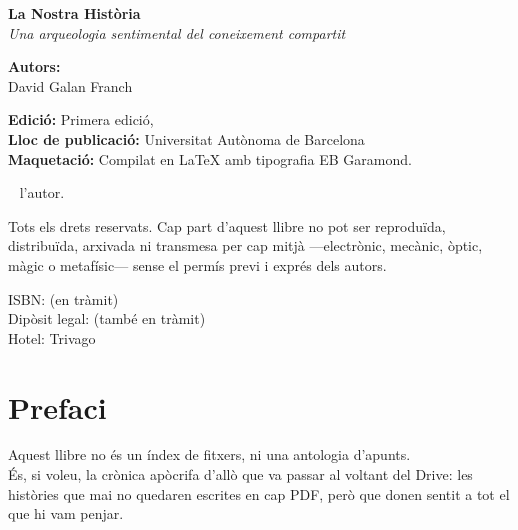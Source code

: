 \thispagestyle{empty}
\newpage

\noindent\textbf{\LARGE La Nostra Història} \\
\vspace{0.5cm}
\noindent\textit{Una arqueologia sentimental del coneixement compartit} \\

\vspace{1cm}

\noindent\textbf{Autors:} \\[0.3em]
David Galan Franch \\[0.3em]

\vspace{0.5cm}

\noindent\textbf{Edició:} Primera edició, \the\year \\
\textbf{Lloc de publicació:} Universitat Autònoma de Barcelona \\
\textbf{Maquetació:} Compilat en \LaTeX{} amb tipografia EB Garamond.

\vspace{0.5cm}

\noindent\textcopyright\
 \the\year{} l'autor.

\noindent Tots els drets reservats. Cap part d’aquest llibre no pot ser reproduïda, distribuïda, arxivada ni transmesa per cap mitjà —electrònic, mecànic, òptic, màgic o metafísic— sense el permís previ i exprés dels autors.

\vspace{0.5cm}

\noindent ISBN: (en tràmit) \\
Dipòsit legal: (també en tràmit) \\
Hotel: Trivago

\cleardoublepage

\chapter*{Prefaci}
\vspace{0.5cm}

\noindent
Aquest llibre no és un índex de fitxers, ni una antologia d’apunts.\\
És, si voleu, la crònica apòcrifa d’allò que va passar al voltant del Drive: les històries que mai no quedaren escrites en cap PDF, però que donen sentit a tot el que hi vam penjar.\\

